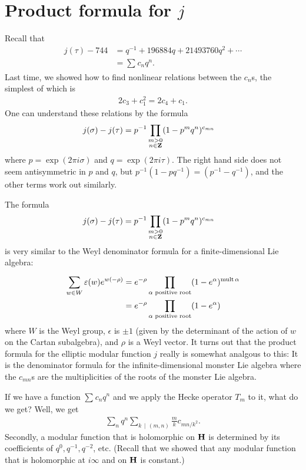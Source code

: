 \documentclass[11pt, oneside,margin=1in]{article}
\begin{document}
\section{Product formula for $j$}
Recall that
\begin{align*}
	j(\tau) - 744 &= q ^{-1} + 196884q + 21493760q^2 + \cdots\\
		      &= \sum_{}^{} c_nq^n.
\end{align*}
Last time, we showed how to find nonlinear relations between the $c_n$s, the simplest of which is
\begin{align*}
	2c_3 + c_1^2 = 2c_4 + c_1.
\end{align*}
One can understand these relations by the formula
\begin{align*}
	j(\sigma)-j(\tau) &= p^{-1} \prod_{\substack{ m > 0\\n\in \mathbf Z}} (1-p^mq^n)^{c_{mn}}
\end{align*}
where $p=\exp(2\pi i \sigma)$ and $q = \exp(2\pi i \tau)$. The right hand side does not seem antisymmetric in $p$ and $q$, but $p^{-1}(1-pq^{-1}) = (p^{-1}-q^{-1})$, and the other terms work out similarly.

The formula \begin{align*}
	j(\sigma)-j(\tau) &= p^{-1} \prod_{\substack{ m > 0\\n\in \mathbf Z}} (1-p^mq^n)^{c_{mn}}
\end{align*}
is very similar to the Weyl denominator formula for a finite-dimensional Lie algebra:
\begin{align*}
	\sum_{w\in W}^{} \varepsilon(w)e^{w (-\rho)} &= e^{-\rho} \prod_{\alpha \textrm{ positive root}}  (1-e^\alpha)^{\operatorname{mult} \alpha} \\&= e^{-\rho} \prod_{\alpha \textrm{ positive root}}  (1-e^\alpha)
\end{align*}
where $W$ is the Weyl group, $\epsilon$ is $\pm 1$ (given by the determinant of the action of $w$ on the Cartan subalgebra), and $\rho $ is a Weyl vector. It turns out that the product formula for the elliptic modular function $j$ really is somewhat analgous to this: It is the denominator formula for the infinite-dimensional monster Lie algebra where the $c_{mn}$s are the multiplicities of the roots of the monster Lie algebra.

If we have a function $\sum_{}^{} c_nq^n$ and we apply the Hecke operator $T_m$ to it, what do we get? Well, we get
\begin{align*}
	\sum_{n}^{} q^n \sum_{k\, \mid \, (m,n)}^{} \frac{m}{k}c_{mn/k^2}.
\end{align*}
Secondly, a modular function that is holomorphic on $\mathbf H$ is determined by its coefficients of $q^0,q^{-1}, q^{-2}$, etc. (Recall that we showed that any modular function that is holomorphic at $i\infty$ and on $\mathbf H$ is constant.)
\end{document}
